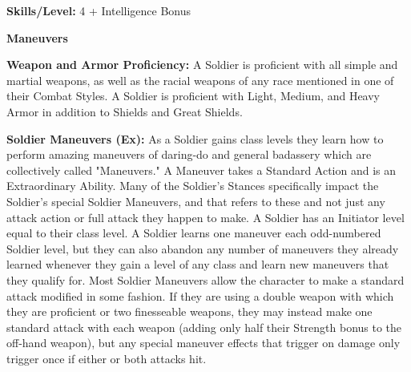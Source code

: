 \textbf{Skills/Level:} 4 + Intelligence Bonus

\modebab{}
\goodfor{}
\poorref{}
\poorwil{}

\begin{extraclasstable}{\textbf{Maneuvers}}
\end{extraclasstable}

\classfeatures

\textbf{Weapon and Armor Proficiency:} A Soldier is proficient with all simple and martial weapons, as well as the racial weapons of any race mentioned in one of their Combat Styles. A Soldier is proficient with Light, Medium, and Heavy Armor in addition to Shields and Great Shields.

\textbf{Soldier Maneuvers (Ex):} As a Soldier gains class levels they learn how to perform amazing maneuvers of daring-do and general badassery which are collectively called "Maneuvers." A Maneuver takes a Standard Action and is an Extraordinary Ability. Many of the Soldier's Stances specifically impact the Soldier's special Soldier Maneuvers, and that refers to these and not just any attack action or full attack they happen to make. A Soldier has an Initiator level equal to their class level. A Soldier learns one maneuver each odd-numbered Soldier level, but they can also abandon any number of maneuvers they already learned whenever they gain a level of any class and learn new maneuvers that they qualify for. Most Soldier Maneuvers allow the character to make a standard attack modified in some fashion. If they are using a double weapon with which they are proficient or two finesseable weapons, they may instead make one standard attack with each weapon (adding only half their Strength bonus to the off-hand weapon), but any special maneuver effects that trigger on damage only trigger once if either or both attacks hit.

